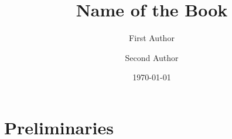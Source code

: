 \documentclass[openright, twoside, british]{book}
\title{Name of the Book}
\author{First Author \and Second Author}
\date{\today}
\begin{document}
\frontmatter



\maketitle\pagebreak











\tableofcontents

\mainmatter

\part{Preliminaries}



\appendix















\end{document}
